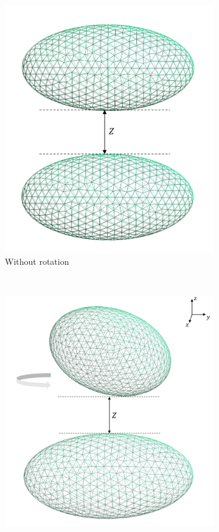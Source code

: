 \begin{figure}[H]
    \begin{subfigure}{\linewidth}
        \centering
        \includegraphics[scale = 0.4]{figures/two_ellipsoids}
        \caption{Without rotation}
        \end{subfigure}\\[1ex]
    \begin{subfigure}{.5\linewidth}
    \centering
    \includegraphics[scale = 0.4]{figures/Ellipsoid_z_axis}

\end{subfigure}
\end{figure}
